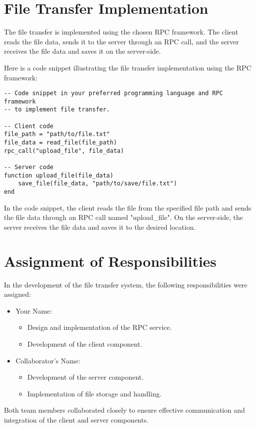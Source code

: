 \documentclass{article}
\begin{document}
\section{File Transfer Implementation}

The file transfer is implemented using the chosen RPC framework. The client reads the file data, sends it to the server through an RPC call, and the server receives the file data and saves it on the server-side.

Here is a code snippet illustrating the file transfer implementation using the RPC framework:

\begin{verbatim}
-- Code snippet in your preferred programming language and RPC framework
-- to implement file transfer.

-- Client code
file_path = "path/to/file.txt"
file_data = read_file(file_path)
rpc_call("upload_file", file_data)

-- Server code
function upload_file(file_data)
    save_file(file_data, "path/to/save/file.txt")
end
\end{verbatim}

In the code snippet, the client reads the file from the specified file path and sends the file data through an RPC call named "upload_file". On the server-side, the server receives the file data and saves it to the desired location.

\section{Assignment of Responsibilities}

In the development of the file transfer system, the following responsibilities were assigned:

\begin{itemize}
  \item Your Name:
  \begin{itemize}
    \item Design and implementation of the RPC service.
    \item Development of the client component.
  \end{itemize}
  \item Collaborator's Name:
  \begin{itemize}
    \item Development of the server component.
    \item Implementation of file storage and handling.
  \end{itemize}
\end{itemize}

Both team members collaborated closely to ensure effective communication and integration of the client and server components.
\end{document}
